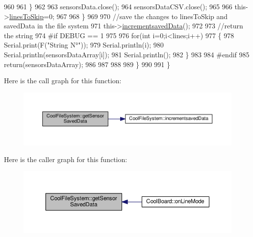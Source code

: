 \begin{DoxyCode}
960 
961             \}
962 
963             sensorsData.close();
964             sensorsDataCSV.close();
965             
966             this->\hyperlink{class_cool_file_system_a84fdb6057e534b395512463daa28ea3c}{linesToSkip}=0;
967         
968         \}
969 
970         \textcolor{comment}{//save the changes to linesToSkip and savedData in the file system}
971         this->\hyperlink{class_cool_file_system_aae045125288f255f3e258073dcada2a6}{incrementsavedData}();
972 
973         \textcolor{comment}{//return the string}
974 \textcolor{preprocessor}{        #if DEBUG == 1}
975         
976             \textcolor{keywordflow}{for}(\textcolor{keywordtype}{int} i=0;i<lines;i++)
977             \{
978                 Serial.print(F(\textcolor{stringliteral}{"String N°"}));
979                 Serial.println(i);
980                 Serial.println(sensorsDataArray[i]);
981                 Serial.println();           
982             \}
983     
984 \textcolor{preprocessor}{        #endif}
985         \textcolor{keywordflow}{return}(sensorsDataArray);
986         
987         
988         
989     \}
990 
991 \}
\end{DoxyCode}
Here is the call graph for this function\+:\nopagebreak
\begin{figure}[H]
\begin{center}
\leavevmode
\includegraphics[width=350pt]{db/d0c/class_cool_file_system_a3223ffff4266a6300988fab956d6b4b2_cgraph}
\end{center}
\end{figure}
Here is the caller graph for this function\+:\nopagebreak
\begin{figure}[H]
\begin{center}
\leavevmode
\includegraphics[width=350pt]{db/d0c/class_cool_file_system_a3223ffff4266a6300988fab956d6b4b2_icgraph}
\end{center}
\end{figure}
\mbox{\label{class_cool_file_system_aae045125288f255f3e258073dcada2a6}} 
